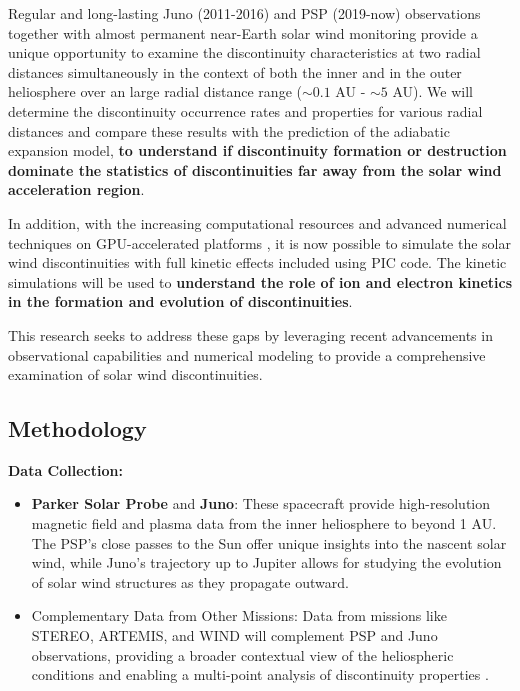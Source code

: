 \documentclass[
  letterpaper,
  DIV=11,
  numbers=noendperiod]{scrartcl}
\begin{document}
Regular and long-lasting Juno (2011-2016) and PSP (2019-now) observations together with almost permanent near-Earth solar wind monitoring provide a unique opportunity to examine the discontinuity characteristics at two radial distances simultaneously in the context of both the inner and in the outer heliosphere over an large radial distance range (\(\sim 0.1\) AU - \(\sim 5\) AU). We will determine the discontinuity occurrence rates and properties for various radial distances and compare these results with the prediction of the adiabatic expansion model, \textbf{to understand if discontinuity formation or destruction dominate the statistics of discontinuities far away from the solar wind acceleration region}.

In addition, with the increasing computational resources and advanced numerical techniques on GPU-accelerated platforms \citep{myersPortingWarpXGPUaccelerated2021}, it is now possible to simulate the solar wind discontinuities with full kinetic effects included using PIC code. The kinetic simulations will be used to \textbf{understand the role of ion and electron kinetics in the formation and evolution of discontinuities}.

This research seeks to address these gaps by leveraging recent advancements in observational capabilities and numerical modeling to provide a comprehensive examination of solar wind discontinuities.

\subsection{Methodology}\label{methodology}

\textbf{Data Collection:}

\begin{itemize}
\item
  \textbf{Parker Solar Probe} and \textbf{Juno}: These spacecraft provide high-resolution magnetic field and plasma data from the inner heliosphere to beyond 1 AU. The PSP's close passes to the Sun offer unique insights into the nascent solar wind, while Juno's trajectory up to Jupiter allows for studying the evolution of solar wind structures as they propagate outward.
\item
  Complementary Data from Other Missions: Data from missions like STEREO, ARTEMIS, and WIND will complement PSP and Juno observations, providing a broader contextual view of the heliospheric conditions and enabling a multi-point analysis of discontinuity properties \citep{velliUnderstandingOriginsHeliosphere2020}.
\end{itemize}
\end{document}
